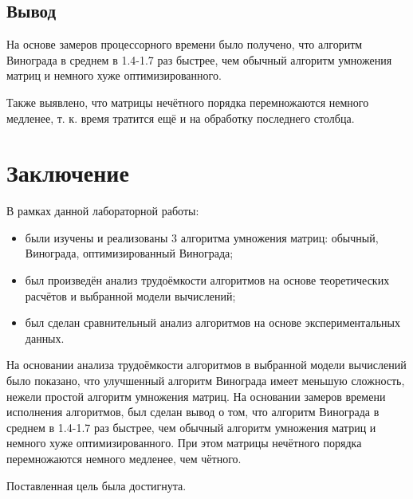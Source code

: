 \documentclass[12pt]{report}
\begin{document}
\section{Вывод}

На основе замеров процессорного времени было получено, что алгоритм Винограда в среднем в 1.4-1.7 раз быстрее, чем обычный алгоритм умножения матриц и немного хуже оптимизированного.

Также выявлено, что матрицы нечётного порядка перемножаются немного медленее, т. к. время тратится ещё и на обработку последнего столбца.


\chapter*{Заключение}

В рамках данной лабораторной работы:

\begin{itemize}
	\item были изучены и реализованы 3 алгоритма умножения матриц: обычный, Винограда, оптимизированный Винограда;
	\item был произведён анализ трудоёмкости алгоритмов на основе теоретических расчётов и выбранной модели вычислений;
	\item был сделан сравнительный анализ алгоритмов на основе экспериментальных данных.
\end{itemize}

На основании анализа трудоёмкости алгоритмов в выбранной модели вычислений было показано, что улучшенный алгоритм Винограда имеет меньшую сложность, нежели простой алгоритм умножения матриц. На основании замеров времени исполнения алгоритмов, был сделан вывод о том, что алгоритм Винограда в среднем в 1.4-1.7 раз быстрее, чем обычный алгоритм умножения матриц и немного хуже оптимизированного. При этом матрицы нечётного порядка перемножаются немного медленее, чем чётного. 

Поставленная цель была достигнута.
\end{document}
